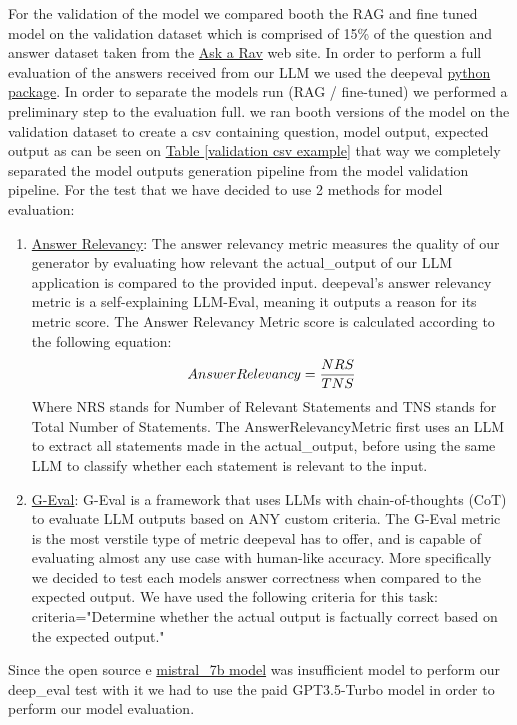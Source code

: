\documentclass[11pt]{article}
\begin{document}
For the validation of the model we compared booth the RAG and fine tuned model on the validation dataset which is comprised of  15\% of the question and answer dataset taken from the \href{https://asktherav.com/ }{Ask a Rav} web site.
In order to perform a full evaluation of the answers received from our LLM we used the deepeval  \href{https://docs.confident-ai.com/ }{python package}.
In order to separate the models run (RAG / fine-tuned) we performed a preliminary step to the evaluation full. we ran booth versions of the model on the validation dataset to create a csv containing question, model output, expected output as can be seen on  \href{#tab:example}{Table \ref*{validation csv example}} that way we completely separated the model outputs generation pipeline  from the model validation pipeline.
For the test that we have decided to use 2 methods for model evaluation:
\begin{enumerate}
    \item   \href{https://docs.confident-ai.com/docs/metrics-answer-relevancy }{Answer Relevancy}: The answer relevancy metric measures the quality of our generator by evaluating how relevant the actual\_output of our LLM application is compared to the provided input. deepeval's answer relevancy metric is a self-explaining LLM-Eval, meaning it outputs a reason for its metric score.
    The Answer Relevancy Metric score is calculated according to the following equation:
    \[Answer Relevancy = \\  \frac{NRS}{TNS} \]
    Where NRS stands for Number of Relevant Statements and TNS stands for Total Number of Statements.
    The AnswerRelevancyMetric first uses an LLM to extract all statements made in the actual\_output, before using the same LLM to classify whether each statement is relevant to the input.
     \item \href{https://docs.confident-ai.com/docs/metrics-llm-evals}{G-Eval}: G-Eval is a framework that uses LLMs with chain-of-thoughts (CoT) to evaluate LLM outputs based on ANY custom criteria. The G-Eval metric is the most verstile type of metric deepeval has to offer, and is capable of evaluating almost any use case with human-like accuracy.
     More specifically we decided to test each models answer correctness when compared to the expected output.
     We have used the following criteria for this task:
     criteria="Determine whether the actual output is factually correct based on the expected output."
     
    
\end{enumerate}
Since the open source e \href{https://mistral.ai/news/announcing-mistral-7b/ }{mistral\_7b model} was insufficient model to perform our deep\_eval test with it we had to use the paid  GPT3.5-Turbo model in order to perform our model evaluation.
\end{document}
